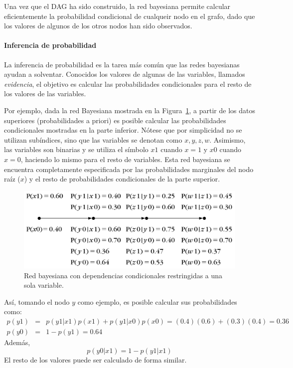 \documentclass{article}
\begin{document}
Una vez que el DAG ha sido construido, la red bayesiana permite calcular eficientemente la probabilidad condicional de cualqueir nodo en el grafo, dado que los valores de algunos de los otros nodos han sido observados.

\paragraph{Inferencia de probabilidad}
\label{par:inferencia_de_probabilidad}
La inferencia de probabilidad es la tarea más común que las redes bayesianas ayudan a solventar.
Conocidos los valores de algunas de las variables, llamados \emph{evidencia}, el objetivo es calcular las probabilidades condicionales para el resto de los valores de las variables.

Por ejemplo, dada la red Bayesiana mostrada en la Figura~\ref{fig:red-bayesiana-calculos}, a partir de los datos superiores (probabilidades a priori) es posible calcular las probabilidades condicionales mostradas en la parte inferior.
Nótese que por simplicidad no se utilizan subíndices, sino que las variables se denotan como $x,y,z,w$.
Asimismo, las variables son binarias y se utiliza el símbolo $x1$ cuando $x=1$ y $x0$ cuando $x=0$, haciendo lo mismo para el resto de variables.
Esta red bayesiana se encuentra completamente especificada por las probabilidades marginales del nodo raíz ($x$) y el resto de probabilidades condicionales de la parte superior.

\begin{figure}[h]
	\centering
	\includegraphics[scale=0.25]{resources/images/red-bayesiana-calculos}
	\caption{Red bayesiana con dependencias condicionales restringidas a una sola variable.}
	\label{fig:red-bayesiana-calculos}
\end{figure}

Así, tomando el nodo $y$ como ejemplo, es posible calcular sus probabilidades como:
\begin{eqnarray}
	p(y1) &=& p(y1 | x1)p(x1) + p(y1|x0)p(x0) = (0.4)(0.6) + (0.3)(0.4) = 0.36 \\
	p(y0) &=& 1-p(y1) = 0.64
\end{eqnarray}
Además, 
\begin{equation}
	p(y0 | x1) = 1 - p(y1 | x1)
\end{equation}
El resto de los valores puede ser calculado de forma similar.
\end{document}
